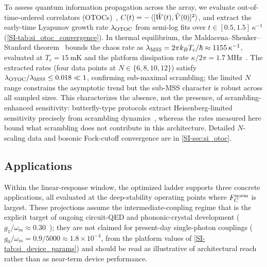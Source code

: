 \documentclass[aps,prxquantum,preprint,superscriptaddress,amsmath,amssymb]{revtex4-2}
\newcommand{\Fnorm}{F_C^{\rm norm}}
\begin{document}
To assess quantum information propagation across the array, we evaluate out-of-time-ordered correlators (OTOCs)~\citep{Swingle2018}, $C(t) = -\braket{[\hat{W}(t), \hat{V}(0)]^2}$, and extract the early-time Lyapunov growth rate $\lambda_{\rm OTOC}$ from semi-log fits over $t \in [\num{0.5}, \num{1.5}]\,\kappa^{-1}$ (\cref{SI-tab:si_otoc_convergence}). In thermal equilibrium, the Maldacena--Shenker--Stanford theorem~\citep{Maldacena2016} bounds the chaos rate as $\lambda_{\rm MSS} = 2\pi k_B T_c/\hbar \approx \num{1155}\,\kappa^{-1}$, evaluated at $T_c = \qty{15}{\milli\kelvin}$ and the platform dissipation rate $\kappa/2\pi=\qty{1.7}{\mega\hertz}$~\citep{MacCabe2020}. The extracted rates (four data points at $N\in\{6,8,10,12\}$) satisfy $\lambda_{\rm OTOC}/\lambda_{\rm MSS} \le \num{0.018} \ll \num{1}$, confirming sub-maximal scrambling; the limited $N$ range constrains the asymptotic trend but the sub-MSS character is robust across all sampled sizes. This characterizes the absence, not the presence, of scrambling-enhanced sensitivity: butterfly-type protocols extract Heisenberg-limited sensitivity precisely from scrambling dynamics~\citep{Kobrin2024}, whereas the rates measured here bound what scrambling does not contribute in this architecture. Detailed $N$-scaling data and bosonic Fock-cutoff convergence are in \cref{SI-sec:si_otoc}.

\subsection{Applications}
\label{sec:applications}

Within the linear-response window, the optimized ladder supports three concrete applications, all evaluated at the deep-stability operating points where $\Fnorm$ is largest. These projections assume the intermediate-coupling regime that is the explicit target of ongoing circuit-QED and phononic-crystal development ($g_1/\omega_m\approx0.30$~\citep{Kockum2019}); they are not claimed for present-day single-photon couplings ($g_0/\omega_m=0.9/5000\approx1.8\times10^{-4}$, from the platform values of \cref{SI-tab:si_device_params}) and should be read as illustrative of architectural reach rather than as near-term device performance.
\end{document}
